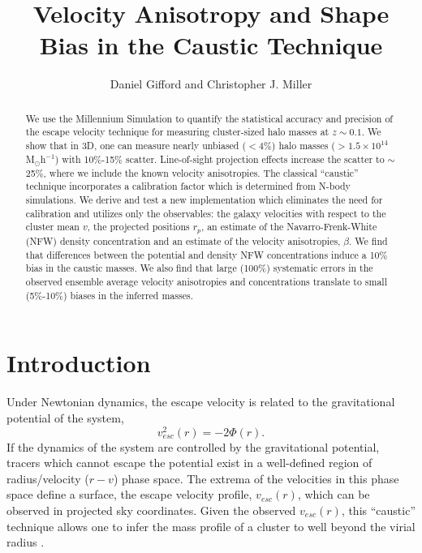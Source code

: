 \documentclass[iop]{emulateapj}
\begin{document}
\title{Velocity Anisotropy and Shape Bias in the Caustic Technique}
\author{Daniel Gifford and Christopher J. Miller}


\begin{abstract}
We use the Millennium Simulation to quantify the statistical accuracy and precision of the escape velocity technique for measuring cluster-sized halo masses at $z \sim 0.1$. We show that in 3D, one can measure nearly unbiased ($<$4\%) halo masses ($> 1.5\times10^{14}$M$_{\odot}$h$^{-1}$) with 10\%-15\% scatter. Line-of-sight projection effects increase the scatter to $\sim$25\%, where we include the known velocity anisotropies. The classical ``caustic'' technique incorporates a calibration factor which is determined from N-body simulations. We derive and test a new implementation which eliminates the need for calibration and utilizes only the observables: the galaxy velocities with respect to the cluster mean $v$, the projected positions $r_p$, an estimate of the Navarro-Frenk-White (NFW) density concentration and an estimate of the velocity anisotropies, $\beta$. We find that differences between the potential and density NFW concentrations induce a 10\% bias in the caustic masses. We also find that large (100\%) systematic errors in the observed ensemble average velocity anisotropies and concentrations translate to small (5\%-10\%) biases in the inferred masses.  
\end{abstract}

\section{Introduction}
\label{sec:introduction}

        Under Newtonian dynamics, the escape velocity is related to the gravitational potential of the system,
        \begin{equation}
            v_{esc}^2(r) = -2\Phi(r) .
        \label{eq:escape}
        \end{equation}
        If the dynamics of the system are controlled by the gravitational potential, tracers which cannot escape the potential exist in a well-defined region of radius/velocity ($r-v$) phase space. The extrema of the velocities in this phase space define a surface, the escape velocity profile,  $v_{esc}(r)$, which can be observed in projected sky coordinates. Given the observed $v_{esc}(r)$, this ``caustic'' technique allows one to infer the mass profile of a cluster to well beyond the virial radius \citep{Diaferio97}.
        
\end{document}
